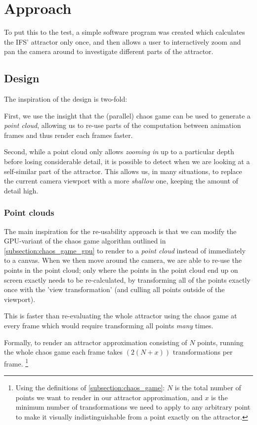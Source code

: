 \documentclass[11pt]{article}
\begin{document}

\section{Approach}
\label{sec:org7621a10}

To put this to the test, a simple software program was created which calculates the IFS' attractor only once,
and then allows a user to interactively zoom and pan the camera around to investigate different parts of the attractor.

\subsection{Design}
\label{sec:org6a9da71}

The inspiration of the design is two-fold:

First, we use the insight that the (parallel) chaos game can be used to generate a \emph{point cloud}, allowing us to re-use parts of the computation between animation frames
and thus render each frames faster.

Second, while a point cloud only allows \emph{zooming in} up to a particular depth before losing considerable detail, 
it is possible to detect when we are looking at a self-similar part of the attractor.
This allows us, in many situations, to replace the current camera viewport with a more \emph{shallow} one, keeping the amount of detail high.

\subsubsection{Point clouds}
\label{sec:org040787b}

The main inspiration for the re-usability approach is that we can modify the GPU-variant of the chaos game algorithm outlined in \autoref{subsection:chaos_game_gpu}
to render to a \emph{point cloud} instead of immediately to a canvas.
When we then move around the camera, we are able to re-use the points in the point cloud;
only where the points in the point cloud end up on screen exactly needs to be re-calculated, 
by transforming all of the points exactly once with the 'view transformation' 
(and culling all points outside of the viewport).

This is faster than re-evaluating the whole attractor using the chaos game at every frame which would require transforming all points \emph{many} times.

Formally, to render an attractor approximation consisting of \(N\) points, 
running the whole chaos game each frame takes \((2(N+x))\) transformations per frame. \footnote{Using the definitions of \autoref{subsection:chaos_game}: \(N\) is the total number of points we want to render in our attractor approximation, 
and \(x\) is the minimum number of transformations we need to apply to any arbitrary point to make it visually indistinguishable from a point exactly on the attractor.}
\end{document}
